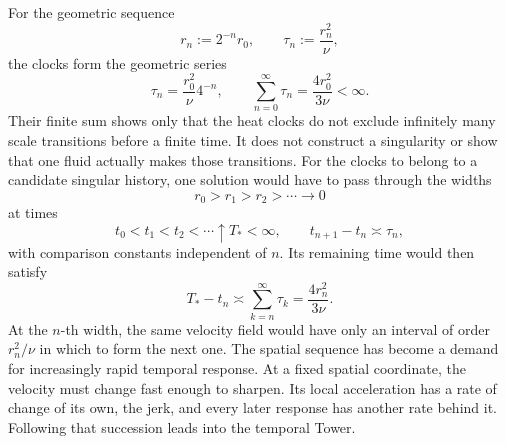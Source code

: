 
For the geometric sequence
\[
  r_n:=2^{-n}r_0,
  \qquad
  \tau_n:=\frac{r_n^2}{\nu},
\]
the clocks form the geometric series
\[
  \tau_n
  =
  \frac{r_0^2}{\nu}4^{-n},
  \qquad
  \sum_{n=0}^{\infty}\tau_n
  =
  \frac{4r_0^2}{3\nu}
  <
  \infty.
\]
Their finite sum shows only that the heat clocks do not exclude infinitely many scale transitions before a finite time.
It does not construct a singularity or show that one fluid actually makes those transitions.
For the clocks to belong to a candidate singular history, one \NavierStokes{} solution would have to pass through the widths
\[
  r_0>r_1>r_2>\cdots\longrightarrow0
\]
at times
\[
  t_0<t_1<t_2<\cdots\uparrow T_*<\infty,
  \qquad
  t_{n+1}-t_n\asymp\tau_n,
\]
with comparison constants independent of \(n\).
Its remaining time would then satisfy
\[
  T_*-t_n
  \asymp
  \sum_{k=n}^{\infty}\tau_k
  =
  \frac{4r_n^2}{3\nu}.
\]
At the \(n\)-th width, the same velocity field would have only an interval of order \(r_n^2/\nu\) in which to form the next one.
The spatial sequence has become a demand for increasingly rapid temporal response.
At a fixed spatial coordinate, the velocity must change fast enough to sharpen.
Its local acceleration has a rate of change of its own, the jerk, and every later response has another rate behind it.
Following that succession leads into the temporal Tower.
